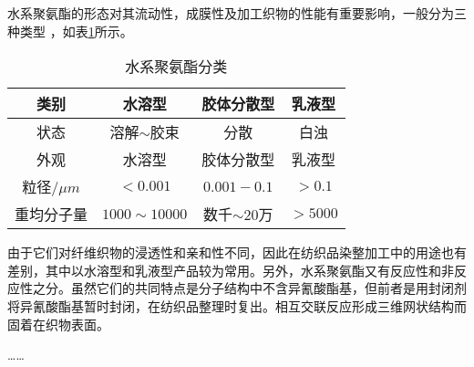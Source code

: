 水系聚氨酯的形态对其流动性，成膜性及加工织物的性能有重要影响，一般分为三种类型\cite{Jiang2005Size} ，如表\ref{tab:category}所示。

\begin{table}
  \centering
  \caption{水系聚氨酯分类}
  \label{tab:category}
  \begin{tabular*}{0.9\textwidth}{@{\extracolsep{\fill}}cccc}
    \toprule
      类别			&水溶型		&胶体分散型		&乳液型 \\
    \midrule
      状态			&溶解$\sim$胶束	&分散		&白浊 \\
      外观			&水溶型		&胶体分散型		&乳液型 \\
      粒径$/\mu m$	&$<0.001$		&$0.001-0.1$		&$>0.1$ \\
      重均分子量	&$1000\sim 10000$	&数千$\sim 20万$ &$>5000$ \\
    \bottomrule
  \end{tabular*}
\end{table}

由于它们对纤维织物的浸透性和亲和性不同，因此在纺织品染整加工中的用途也有差别，其中以水溶型和乳液型产品较为常用。另外，水系聚氨酯又有反应性和非反应性之分。虽然它们的共同特点是分子结构中不含异氰酸酯基，但前者是用封闭剂将异氰酸酯基暂时封闭，在纺织品整理时复出。相互交联反应形成三维网状结构而固着在织物表面。

……

